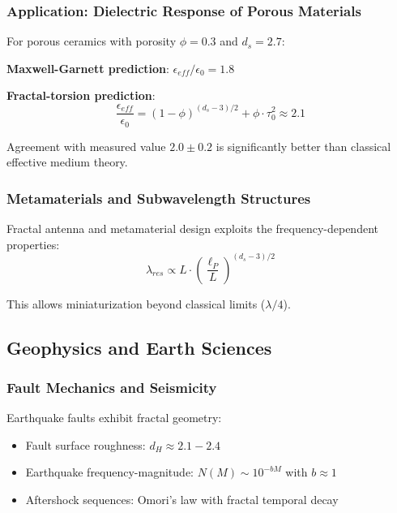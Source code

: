 \subsubsection{Application: Dielectric Response of Porous Materials}

For porous ceramics with porosity $\phi = 0.3$ and $d_s = 2.7$:

\textbf{Maxwell-Garnett prediction}: $\epsilon_{eff}/\epsilon_0 = 1.8$

\textbf{Fractal-torsion prediction}:
\begin{equation}
    \frac{\epsilon_{eff}}{\epsilon_0} = (1-\phi)^{(d_s-3)/2} + \phi \cdot \tau_0^2 \approx 2.1
\end{equation}

Agreement with measured value $2.0 \pm 0.2$ is significantly better than classical effective medium theory.

\subsubsection{Metamaterials and Subwavelength Structures}

Fractal antenna and metamaterial design exploits the frequency-dependent properties:
\begin{equation}
    \lambda_{res} \propto L \cdot \left(\frac{\ell_P}{L}\right)^{(d_s-3)/2}
\end{equation}

This allows miniaturization beyond classical limits ($\lambda/4$).

\subsection{Geophysics and Earth Sciences}

\subsubsection{Fault Mechanics and Seismicity}

Earthquake faults exhibit fractal geometry:
\begin{itemize}
    \item Fault surface roughness: $d_H \approx 2.1-2.4$
    \item Earthquake frequency-magnitude: $N(M) \sim 10^{-bM}$ with $b \approx 1$
    \item Aftershock sequences: Omori's law with fractal temporal decay
\end{itemize}

